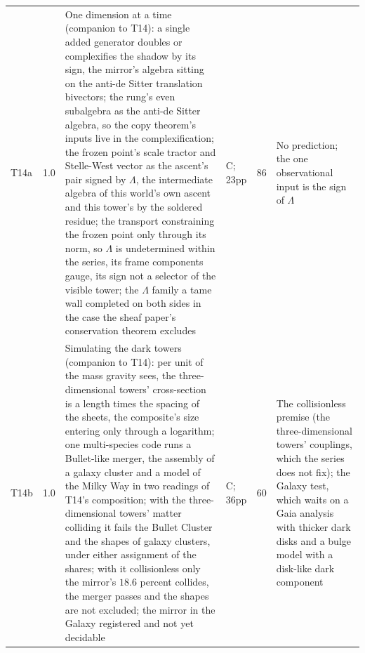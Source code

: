 \documentclass[11pt]{article}
\theoremstyle{definition}
\theoremstyle{plain}
\begin{document}
\begin{longtable}{p{} p{} p{} p{} p{} p{}}
T14a & 1.0 & One dimension at a time (companion to T14): a single added generator doubles or complexifies the shadow by its sign, the mirror's algebra sitting on the anti-de Sitter translation bivectors; the rung's even subalgebra as the anti-de Sitter algebra, so the copy theorem's inputs live in the complexification; the frozen point's scale tractor and Stelle-West vector as the ascent's pair signed by $\Lambda$, the intermediate algebra of this world's own ascent and this tower's by the soldered residue; the transport constraining the frozen point only through its norm, so $\Lambda$ is undetermined within the series, its frame components gauge, its sign not a selector of the visible tower; the $\Lambda$ family a tame wall completed on both sides in the case the sheaf paper's conservation theorem excludes \cite{ButlerT14a} & C; 23pp & 86 & No prediction; the one observational input is the sign of $\Lambda$ \\
T14b & 1.0 & Simulating the dark towers (companion to T14): per unit of the mass gravity sees, the three-dimensional towers' cross-section is a length times the spacing of the sheets, the composite's size entering only through a logarithm; one multi-species code runs a Bullet-like merger, the assembly of a galaxy cluster and a model of the Milky Way in two readings of T14's composition; with the three-dimensional towers' matter colliding it fails the Bullet Cluster and the shapes of galaxy clusters, under either assignment of the shares; with it collisionless only the mirror's $18.6$ percent collides, the merger passes and the shapes are not excluded; the mirror in the Galaxy registered and not yet decidable \cite{ButlerT14b} & C; 36pp & 60 & The collisionless premise (the three-dimensional towers' couplings, which the series does not fix); the Galaxy test, which waits on a Gaia analysis with thicker dark disks and a bulge model with a disk-like dark component \\

\end{longtable}
\end{document}
